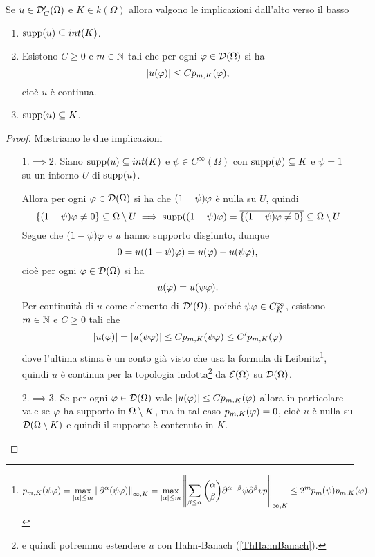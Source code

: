 \begin{proposition}\label{PrSupportoCompattoEContinuita}
Se $u\in \mathcal{D}_C'(\Omega)$ e $K\in k(\Omega)$ allora valgono le implicazioni dall'alto verso il basso
\begin{enumerate}
    \item $\operatorname{supp}(u)\subseteq int(K)$.
    \item Esistono $C\geq 0$ e $m\in\mathbb{N}$ tali che per ogni $\varphi\in\mathcal{D}(\Omega)$ si ha 
    \[\left|{u(\varphi)}\right|\leq Cp_{m,K}(\varphi),\]
    cio\`e $u$ \`e continua.
    \item $\operatorname{supp}(u)\subseteq K$.
\end{enumerate}
\end{proposition}
\begin{proof}
    Mostriamo le due implicazioni
\setlength{\leftmargini}{0cm}
\begin{itemize}
\item[$\boxed{1.\implies2.}$] Siano $\operatorname{supp}(u)\subseteq int(K)$ e $\psi\in C^\infty(\Omega)$ con $\operatorname{supp}(\psi)\subseteq K$ e $\psi=1$ su un intorno $U$ di $\operatorname{supp}(u)$.

Allora per ogni $\varphi\in \mathcal{D}(\Omega)$ si ha che $(1-\psi)\varphi$ \` e nulla su $U$, quindi
\[\left\{{(1-\psi)\varphi\neq 0}\right\}\subseteq \Omega\setminus U\implies \operatorname{supp}((1-\psi)\varphi)=\overline{\left\{{(1-\psi)\varphi\neq 0}\right\}}\subseteq \Omega\setminus U\]
Segue che $(1-\psi)\varphi$ e $u$ hanno supporto disgiunto, dunque
\[0=u((1-\psi)\varphi)=u(\varphi)-u(\psi\varphi),\]
cio\`e per ogni $\varphi\in \mathcal{D}(\Omega)$ si ha
\[u(\varphi)=u(\psi\varphi).\]
Per continuit\`a di $u$ come elemento di $\mathcal{D}'(\Omega)$, poich\'e $\psi\varphi\in C^\infty_K$, esistono $m\in \mathbb{N}$ e $C\geq 0$ tali che
\[\left|{u(\varphi)}\right|=\left|{u(\psi\varphi)}\right|\leq Cp_{m,K}(\psi\varphi)\leq C'p_{m,K}(\varphi)\]
dove l'ultima stima \`e un conto gi\`a visto che usa la formula di Leibnitz\footnote{\[p_{m,K}(\psi\varphi)=\max_{\left|{\alpha}\right|\leq m}\left\Vert{\partial^\alpha(\psi\varphi)}\right\Vert_{\infty,K}=\max_{\left|{\alpha}\right|\leq m}\left\Vert{\sum_{\beta\leq \alpha}\binom {\alpha}\beta\partial^{\alpha-\beta}\psi\partial^{\beta} vp}\right\Vert_{\infty,K}\leq 2^mp_m(\psi)p_{m,K}(\varphi).\]}, quindi $u$ \`e continua per la topologia indotta\footnote{e quindi potremmo estendere $u$ con Hahn-Banach (\ref{ThHahnBanach}).} da $\mathcal{E}(\Omega)$ su $\mathcal{D}(\Omega)$.
\item[$\boxed{2.\implies3.}$] Se per ogni $\varphi\in \mathcal{D}(\Omega)$ vale $\left|{u(\varphi)}\right|\leq Cp_{m,K}(\varphi)$ allora in particolare vale se $\varphi$ ha supporto in $\Omega\setminus K$, ma in tal caso $p_{m,K}(\varphi)=0$, cio\`e $u$ \`e nulla su $\mathcal{D}(\Omega\setminus K)$ e quindi il supporto \`e contenuto in $K$.
\end{itemize}
\setlength{\leftmargini}{0.5cm}
\end{proof}
